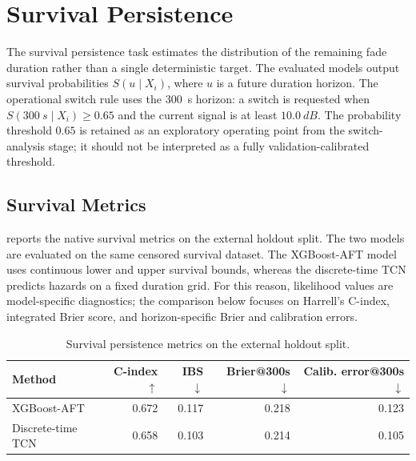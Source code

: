 \section{Survival Persistence}
\label{sec:results-survival-persistence}

The survival persistence task estimates the distribution of the remaining fade
duration rather than a single deterministic target. The evaluated models output
survival probabilities \(S(u \mid X_i)\), where \(u\) is a future duration
horizon. The operational switch rule uses the \SI{300}{s} horizon: a switch is
requested when \(S(\SI{300}{s}\mid X_i)\geq 0.65\) and the current signal is at
least \(\SI{10.0}{dB}\). The probability threshold \(0.65\) is retained as an
exploratory operating point from the switch-analysis stage; it should not be
interpreted as a fully validation-calibrated threshold.

\subsection{Survival Metrics}
\label{sec:results-survival-metrics}

 reports the native survival metrics on the external
holdout split. The two models are evaluated on the same censored survival
dataset. The XGBoost-AFT model uses continuous lower and upper survival bounds,
whereas the discrete-time TCN predicts hazards on a fixed duration grid. For
this reason, likelihood values are model-specific diagnostics; the comparison
below focuses on Harrell's C-index, integrated Brier score, and horizon-specific
Brier and calibration errors.

\begin{table}[htbp]
  \centering
  \caption{Survival persistence metrics on the external holdout split.}
  \label{tab:survival-results}
  \small
  \setlength{\tabcolsep}{4pt}
  \renewcommand{\arraystretch}{1.15}
  \begin{tabular}{
    @{}
    >{\raggedright\arraybackslash}p{}
    rrrr
    @{}
  }
    \toprule
    Method & C-index \(\uparrow\) & IBS \(\downarrow\) & Brier@300s \(\downarrow\) & Calib. error@300s \(\downarrow\) \\
    \midrule
    XGBoost-AFT & 0.672 & 0.117 & 0.218 & 0.123 \\
    Discrete-time TCN & 0.658 & 0.103 & 0.214 & 0.105 \\
    \bottomrule
  \end{tabular}
\end{table}

